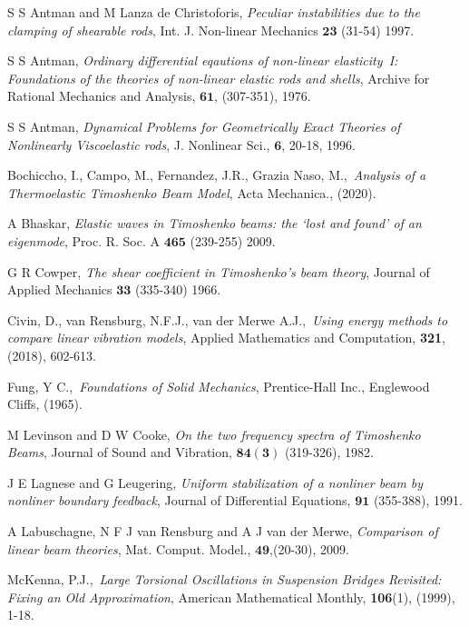 \documentclass[main.tex]{subfiles}
\begin{document}
\begin{thebibliography}{AAA}
 S S Antman and M Lanza de Christoforis, {\it Peculiar
instabilities due to the clamping of shearable rods}, Int. J.
Non-linear Mechanics $\mathbf{23}$ (31-54) 1997.

 S S Antman, {\it Ordinary differential eqautions of
non-linear elasticity~I: Foundations of the theories of non-linear
elastic rods and shells}, Archive for Rational Mechanics and
Analysis, $\mathbf{61}$, (307-351), 1976.

 S S Antman, {\it Dynamical Problems for Geometrically
Exact Theories of Nonlinearly Viscoelastic rods}, J. Nonlinear Sci.,
$\mathbf{6}$, 20-18, 1996.

 Bochiccho, I., Campo, M., Fernandez, J.R., Grazia Naso, M.,\ \textit{Analysis of a Thermoelastic Timoshenko Beam Model}, Acta Mechanica., (2020).

 A Bhaskar, {\it Elastic waves in Timoshenko beams: the
`lost and found' of an eigenmode}, Proc. R. Soc. A $\mathbf{465}$
(239-255) 2009.

 G R Cowper, {\it The shear coefficient in Timoshenko's beam
theory}, Journal of Applied Mechanics $\mathbf{33}$ (335-340) 1966.

 Civin, D., van Rensburg, N.F.J., van der Merwe A.J.,\ \textit{Using energy methods to compare linear vibration models}, Applied Mathematics and Computation, \textbf{321}, (2018), 602-613.

 Fung, Y C.,\ \textit{Foundations of Solid Mechanics}, Prentice-Hall Inc., Englewood Cliffs, (1965).

 M Levinson and D W Cooke, {\it On the two frequency spectra of Timoshenko Beams}, Journal of
Sound and Vibration, $\mathbf{84(3)}$ (319-326), 1982.

 J E Lagnese and G Leugering, {\it Uniform stabilization of
a nonliner beam by nonliner boundary feedback}, Journal of
Differential Equations, $\mathbf{91}$ (355-388), 1991.

 A Labuschagne, N F J van Rensburg and A J van der Merwe,
{\it Comparison of linear  beam theories}, Mat. Comput. Model.,
$\mathbf{49}$,(20-30), 2009.

 McKenna, P.J.,\ \textit{Large Torsional Oscillations in Suspension Bridges Revisited: Fixing an Old Approximation}, American Mathematical Monthly, \textbf{106}(1), (1999), 1-18.


\end{thebibliography}
\end{document}
